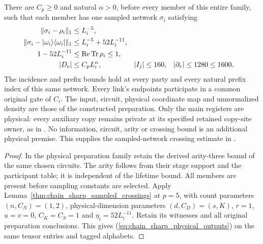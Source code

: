 \begin{lemma}
    There are $C_p\ge0$ and natural $\alpha>0$, before every
    member of this entire family, such that each member has one
    sampled network $\sigma_i$ satisfying
    \begin{align}
        \|\sigma_i-\rho_i\|_1 & \le L_i^{-5},\notag                                                        \\
        \|\sigma_i-|\omega_i\rangle\langle\omega_i|\|_1
                              & \le L_i^{-5}+52L_i^{-11},\notag                                            \\
        1-52L_i^{-11}         & \le\operatorname{Re}\operatorname{Tr}\rho_i\le1,\notag                     \\
        |D_e|                 & \le C_pL_i^\alpha,                                     & |I_j| & \le160, &
        |\partial_r|          & \le1280\le1600.
        \label{eq:chain_sharp_physical_outputs}
    \end{align}
    The incidence and prefix bounds hold at every party and every
    natural prefix index of this same network. Every link's
    endpoints participate in a common original gate of $C_i$.
    The input, circuit, physical coordinate map and unnormalized
    density are those of the constructed preparation.
    Only the main registers are physical: every auxiliary copy
    remains private at its specified retained copy-site owner, as in
    \cite{gap:tnlean_one_dimensional_band_sweep_corrections}.
    No information, circuit, arity or crossing bound is an additional
    physical premise. This supplies the sampled-network crossing
    estimate in \cite[Part~II, proof of Theorem~B]{TNLean2026OneDimensional}.
\end{lemma}
\begin{proof}\leanok
    In the physical preparation family retain the derived arity-three
    bound of the same chosen circuits. The arity follows from their
    stage support and the participant table; it is independent
    of the lifetime bound. All members are present before sampling
    constants are selected.
    Apply Lemma~\ref{thm:chain_sharp_sampled_crossings} at $p=5$,
    with count parameters $(n,C_N)=(1,2)$, physical-dimension
    parameters $(d,C_D)=(s,K)$, $r=1$, $u=v=0$,
    $C_K=C_S=1$ and $\eta_i=52L_i^{-11}$.
    Retain its witnesses and all original preparation conclusions.
    This gives (\ref{eq:chain_sharp_physical_outputs}) on the same
    tensor entries and tagged alphabets.
\end{proof}
